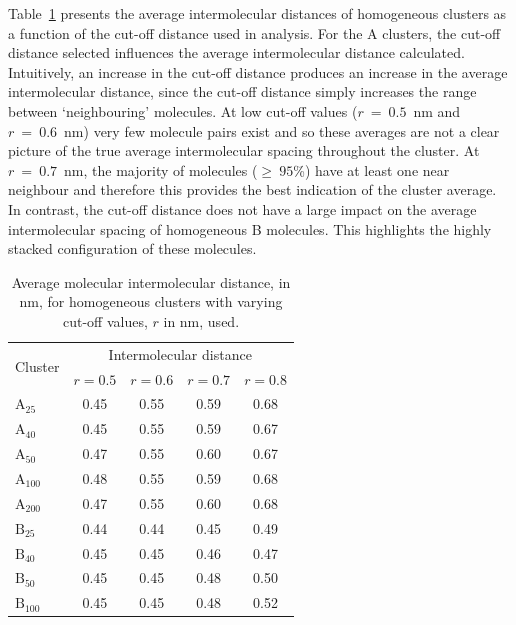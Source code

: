 Table~\ref{tableSI:intermolecdistscutoff} presents the average intermolecular distances of homogeneous clusters as a function of the cut-off distance used in analysis. For the A clusters, the cut-off distance selected influences the average intermolecular distance calculated.  Intuitively, an increase in the cut-off distance produces an increase in the average intermolecular distance, since the cut-off distance simply increases the range between `neighbouring' molecules. At low cut-off values ($r~=~0.5$~nm and $r~=~0.6$~nm) very few molecule pairs exist and so these averages are not a clear picture of the true average intermolecular spacing throughout the cluster.  At $r~=~0.7$~nm, the majority of molecules ($\ge~95$\%) have at least one near neighbour and therefore this provides the best indication of the cluster average. In contrast, the cut-off distance does not have a large impact on the average intermolecular spacing of homogeneous B molecules. This highlights the highly stacked configuration of these molecules.
% 
\begin{table}[!h]
\centering
\caption{Average molecular intermolecular distance, in nm, for homogeneous clusters with varying cut-off values, $r$ in nm, used.}
\label{tableSI:intermolecdistscutoff}
\begin{tabular}{lcccc}
\hline
\multicolumn{1}{l}{\multirow{2}{*}{Cluster}} & \multicolumn{4}{c}{\multirow{1}{*}{Intermolecular distance}} \\
 & $r = 0.5$ & $r = 0.6$ & $r = 0.7$ & $r = 0.8$ \\ \hline
$\text{A}_{\text{25}}$ & 0.45 & 0.55 & 0.59 & 0.68 \\
$\text{A}_{\text{40}}$ & 0.45 & 0.55 & 0.59 & 0.67 \\
$\text{A}_{\text{50}}$ & 0.47 & 0.55 & 0.60 & 0.67 \\
$\text{A}_{\text{100}}$ & 0.48 & 0.55 & 0.59 & 0.68 \\
$\text{A}_{\text{200}}$ & 0.47 & 0.55 & 0.60 & 0.68 \\ \hline
$\text{B}_{\text{25}}$ & 0.44 & 0.44 & 0.45 & 0.49 \\
$\text{B}_{\text{40}}$ & 0.45 & 0.45 & 0.46 & 0.47 \\
$\text{B}_{\text{50}}$ & 0.45 & 0.45 & 0.48 & 0.50 \\ 
$\text{B}_{\text{100}}$ & 0.45 & 0.45 & 0.48 & 0.52 \\ \hline
\end{tabular}
\end{table}
%
\newpage

